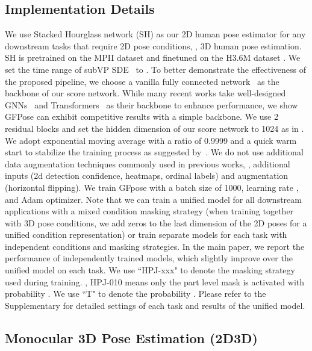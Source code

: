 \documentclass[10pt,twocolumn,letterpaper]{article}
\begin{document}
\subsection{Implementation Details}
\label{subsec:impl_details}
We use Stacked Hourglass network (SH) \cite{newell2016stacked} as our 2D human pose estimator for any downstream tasks that require 2D pose conditions, \eg, 3D human pose estimation. SH is pretrained on the MPII dataset \cite{andriluka20142d} and finetuned on the H3.6M dataset \cite{h36m_pami}. 
We set the time range of subVP SDE~\cite{song2020score} to . 
To better demonstrate the effectiveness of the proposed pipeline, we choose a vanilla fully connected network~\cite{martinez_2017_3dbaseline} as the backbone of our score network. While many recent works take well-designed GNNs~\cite{lcn-pami,zeng2021learning} and Transformers~\cite{li2022mhformer,zheng20213d} as their backbone to enhance performance, we show GFPose can exhibit competitive results with a simple backbone. 
We use 2 residual blocks and set the hidden dimension of our score network to 1024 as in \cite{martinez_2017_3dbaseline}. 
We adopt exponential moving average with a ratio of 0.9999 and a quick warm start to stabilize the training process as suggested by~\cite{song2019generative}. 
We do not use additional data augmentation techniques commonly used in previous works, \eg, additional inputs (2d detection confidence, heatmaps, ordinal labels) and augmentation (horizontal flipping). We train GFpose with a batch size of 1000, learning rate , and Adam optimizer\cite{kingma2014adam}. 
Note that we can train a unified model for all downstream applications with a mixed condition masking strategy (when training together with 3D pose conditions, we add zeros to the last dimension of the 2D poses for a unified condition representation) or train separate models for each task with independent conditions and masking strategies. 
In the main paper, we report the performance of independently trained models, which slightly improve over the unified model on each task. We use ``HPJ-xxx" to denote the masking strategy used during training. \Eg, HPJ-010 means only the part level mask is activated with probability . We use ``T" to denote the probability . Please refer to the Supplementary for detailed settings of each task and results of the unified model.




\subsection{Monocular 3D Pose Estimation (2D3D)}
\end{document}

